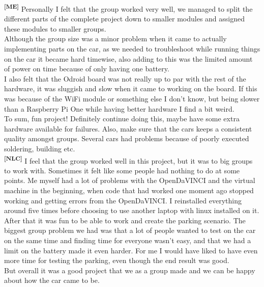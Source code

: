 \noindent
\textsuperscript{\textbf{[ME]}}
Personally I felt that the group worked very well, we managed to split the
different parts of the complete project down to smaller modules and assigned
these modules to smaller groups.\\
Although the group size was a minor problem when it came to actually
implementing parts on the car, as we needed to troubleshoot while running things
on the car it became hard timewise, also adding to this was the limited amount
of power on time because of only having one battery.\\
I also felt that the Odroid board was not really up to par with the rest of the
hardware, it was sluggish and slow when it came to working on the board. If this
was because of the WiFi module or something else I don’t know, but being slower
than a Raspberry Pi One while having better hardware I find a bit weird.\\
To sum, fun project! Definitely continue doing this, maybe have some extra
hardware available for failures. Also, make sure that the cars keeps a
consistent quality amongst groups. Several cars had problems because of poorly
executed soldering, building etc.\\

\noindent
\textsuperscript{\textbf{[NLC]}}
I feel that the group worked well in this project, but it was to big groups to
work with. Sometimes it felt like some people had nothing to do at some points.
Me myself had a lot of problems with the OpenDaVINCI and the virtual machine in
the beginning, when code that had worked one moment ago stopped working and
getting errors from the OpenDaVINCI. I reinstalled everything around five times
before choosing to use another laptop with linux installed on it. After that it
was fun to be able to work and create the parking scenario. The biggest group
problem we had was that a lot of people wanted to test on the car on the same
time and finding time for everyone wasn’t easy, and that we had a limit on the
battery made it even harder. For me I would have liked to have even more time
for testing the parking, even though the end result was good.\\
But overall it was a good project that we as a group made and we can be happy
about how the car came to be.\\

